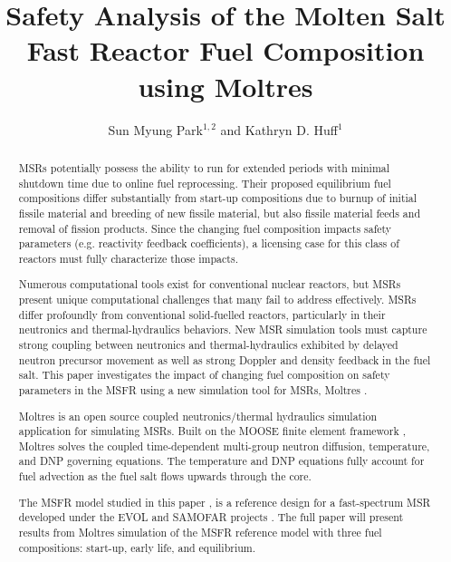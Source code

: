 \documentclass{anstrans}
\title{Safety Analysis of the Molten Salt Fast Reactor Fuel Composition using Moltres}
\author{Sun Myung Park$^{1,2}$ and Kathryn D. Huff$^1$}
\institute{$^1$Dept. of Nuclear, Plasma and Radiological Engineering, University of Illinois at Urbana-Champaign \\
$^2$smpark3@illinois.edu}
\begin{document}
\begin{abstract}
%
        \glspl{MSR} potentially possess the ability to run for extended 
        periods with minimal shutdown time due to online fuel reprocessing.  
        Their proposed equilibrium fuel compositions differ substantially from 
        start-up compositions due to burnup of initial fissile material and 
        breeding of new fissile material, but also fissile material feeds and 
        removal of fission products.  Since the changing fuel composition 
        impacts safety parameters (e.g. reactivity feedback coefficients), a 
        licensing case for this class of reactors  must fully characterize 
        those impacts. 

Numerous computational tools exist for conventional nuclear reactors, but 
        \glspl{MSR} present unique computational challenges that many fail to 
        address effectively.  \glspl{MSR} differ profoundly from conventional 
        solid-fuelled reactors, particularly in their neutronics and 
        thermal-hydraulics behaviors.  New \gls{MSR} simulation tools must 
        capture strong coupling between neutronics and thermal-hydraulics 
        exhibited by delayed neutron precursor movement as well as strong 
        Doppler and density feedback in the fuel salt.  This paper investigates 
        the impact of changing fuel composition on safety parameters in the 
        \gls{MSFR}  using a new simulation tool for \glspl{MSR}, Moltres 
        \cite{lindsay_introduction_2018}.

Moltres is an open source coupled neutronics/thermal hydraulics simulation 
        application for simulating \glspl{MSR}. Built on the \gls{MOOSE} finite 
        element framework \cite{gaston_moose:_2009}, Moltres solves the coupled 
        time-dependent multi-group neutron diffusion, temperature, and 
        \gls{DNP} governing equations.  The temperature and DNP equations fully 
        account for fuel advection as the fuel salt flows upwards through the 
        core.

The \gls{MSFR} model studied in this paper
        \cite{merle-lucotte_launching_2011}, is a reference design for a 
        fast-spectrum \gls{MSR} developed under the \gls{EVOL} and 
        \gls{SAMOFAR} projects \cite{serp_molten_2014}.
        The full paper will present results from Moltres simulation of the 
        \gls{MSFR} reference model with three fuel compositions:
        start-up, early life, and equilibrium.


\end{abstract}
\end{document}
